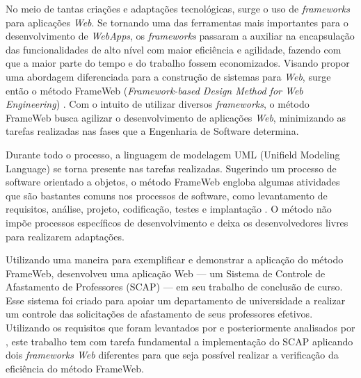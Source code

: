 No meio de tantas criações e adaptações tecnológicas, surge o uso de \textit{frameworks} para aplicações \textit{Web}. Se tornando uma das ferramentas mais importantes para o desenvolvimento de \textit{WebApps}, os \textit{frameworks} passaram a auxiliar na encapsulação das funcionalidades de alto nível com maior eficiência e agilidade, fazendo com que a maior parte do tempo e do trabalho fossem economizados. Visando propor uma abordagem diferenciada para a construção de sistemas para \textit{Web}, surge então o método FrameWeb (\textit{Framework-based Design Method for Web Engineering}) \cite{souza:masterthesis07}. Com o intuito de utilizar diversos \textit{frameworks}, o método FrameWeb busca agilizar o desenvolvimento de aplicações \textit{Web}, minimizando as tarefas realizadas nas fases que a Engenharia de Software determina.

Durante todo o processo, a linguagem de modelagem UML (Unifield Modeling Language) \cite{booch-et-al:u06} se torna presente nas tarefas realizadas. Sugerindo um processo de software orientado a objetos, o método FrameWeb engloba algumas atividades que são bastantes comuns nos processos de software, como levantamento de requisitos, análise, projeto, codificação, testes e implantação \cite{souza:masterthesis07}. O método não impõe processos específicos de desenvolvimento e deixa os desenvolvedores livres para realizarem adaptações.

Utilizando uma maneira para exemplificar e demonstrar a aplicação do método FrameWeb,  desenvolveu uma aplicação Web --- um Sistema de Controle de Afastamento de Professores (SCAP) --- em seu trabalho de conclusão de curso. Esse sistema foi criado para apoiar um departamento de universidade a realizar um controle das solicitações de afastamento de seus professores efetivos. Utilizando os requisitos que foram levantados por  e posteriormente analisados por , este trabalho tem com tarefa fundamental a implementação do SCAP aplicando dois \textit{frameworks Web} diferentes para que seja possível realizar a verificação da eficiência do método FrameWeb.